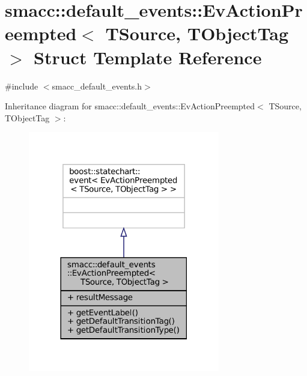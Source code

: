 \hypertarget{structsmacc_1_1default__events_1_1EvActionPreempted}{}\section{smacc\+:\+:default\+\_\+events\+:\+:Ev\+Action\+Preempted$<$ T\+Source, T\+Object\+Tag $>$ Struct Template Reference}
\label{structsmacc_1_1default__events_1_1EvActionPreempted}


{\ttfamily \#include $<$smacc\+\_\+default\+\_\+events.\+h$>$}



Inheritance diagram for smacc\+:\+:default\+\_\+events\+:\+:Ev\+Action\+Preempted$<$ T\+Source, T\+Object\+Tag $>$\+:
\nopagebreak
\begin{figure}[H]
\begin{center}
\leavevmode
\includegraphics[width=237pt]{structsmacc_1_1default__events_1_1EvActionPreempted__inherit__graph}
\end{center}
\end{figure}


